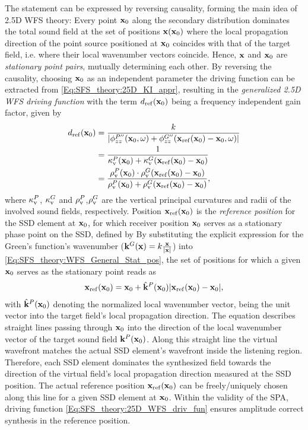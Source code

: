 The statement can be expressed by reversing causality, forming the main idea of 2.5D WFS theory: 
Every point $\mathbf{x}_0$ along the secondary distribution dominates the total sound field at the set of positions $\mathbf{x}(\mathbf{x}_0)$ where the local propagation direction of the point source positioned at $\mathbf{x}_0$ coincides with that of the target field, i.e. where their local wavenumber vectors coincide.
Hence, $\mathbf{x}$ and $\mathbf{x}_0$ are \emph{stationary point pairs}, mutually determining each other.
By reversing the causality, choosing $\mathbf{x}_0$ as an independent parameter the driving function can be extracted from \eqref{Eq:SFS_theory:25D_KI_appr}, resulting in the \emph{generalized 2.5D WFS driving function}
with the term $d_{\mathrm{ref}}(\mathbf{x}_0)$ being a frequency independent gain factor, given by
\begin{align}
\label{Eq:SFS_theory:Referencing function}
d_{\mathrm{ref}}(\mathbf{x}_0) &= \frac{k}{|\phi^{P''}_{zz}(\mathbf{x}_0,\omega) +\phi^{G''}_{zz}(\mathbf{x}_{\mathrm{ref}}(\mathbf{x}_0)-\mathbf{x}_0,\omega)|}\\
		 	&= \frac{1}{\kappa_\mathrm{v}^P(\mathbf{x}_0)+ \kappa_\mathrm{v}^G(\mathbf{x}_{\mathrm{ref}}(\mathbf{x}_0)-\mathbf{x}_0)}  \\
			&= \frac{\rho_\mathrm{v}^P(\mathbf{x}_0) \cdot \rho_\mathrm{v}^G(\mathbf{x}_{\mathrm{ref}}(\mathbf{x}_0)-\mathbf{x}_0)}{\rho_\mathrm{v}^P(\mathbf{x}_0)+ \rho_\mathrm{v}^G(\mathbf{x}_{\mathrm{ref}}(\mathbf{x}_0)-\mathbf{x}_0)} 
,
\end{align}
where $\kappa_\mathrm{v}^P$, $\kappa_\mathrm{v}^G$ and $\rho_\mathrm{v}^P$,$\rho_\mathrm{v}^G$ are the vertical principal curvatures and radii of the involved sound fields, respectively.
Position $\mathbf{x}_{\mathrm{ref}}(\mathbf{x}_0)$ is the \emph{reference position} for the SSD element at $\mathbf{x}_0$, for which receiver position $\mathbf{x}_0$ serves as a stationary phase point on the SSD, defined by
By substituting the explicit expression for the Green's function's wavenumber ($\mathbf{k}^G(\mathbf{x}) = k\frac{\mathbf{x}}{|\mathbf{x}|}$) into \eqref{Eq:SFS_theory:WFS_General_Stat_pos}, the set of positions for which a given $\mathbf{x}_0$ serves as the stationary point reads as 
\begin{align} 
\mathbf{x}_{\mathrm{ref}}(\mathbf{x}_0) = \mathbf{x}_0 + \hat{\mathbf{k}}^P(\mathbf{x}_0) |\mathbf{x}_{\mathrm{ref}}(\mathbf{x}_0)-\mathbf{x}_0|,
\label{Eq:SFS_theory:SSD_ref_positions}
\end{align} 
with $\hat{\mathbf{k}}^P(\mathbf{x}_0)$ denoting the normalized local wavenumber vector, being the unit vector into the target field's local propagation direction.
The equation describes straight lines passing through $\mathbf{x}_0$ into the direction of the local wavenumber vector of the target sound field $\mathbf{k}^P(\mathbf{x}_0)$.
Along this straight line the virtual wavefront matches the actual SSD element's wavefront inside the listening region.
Therefore, each SSD element dominates the synthesized field towards the direction of the virtual field's local propagation direction measured at the SSD position.
The actual reference position $\mathbf{x}_{\mathrm{ref}}(\mathbf{x}_0)$ can be freely/uniquely chosen along this line for a given SSD element at $\mathbf{x}_0$. 
Within the validity of the SPA, driving function \eqref{Eq:SFS_theory:25D_WFS_driv_fun} ensures amplitude correct synthesis in the reference position.

